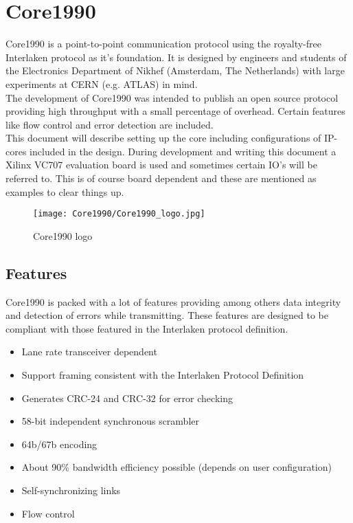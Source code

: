 \section{Core1990}
\label{Appendix:Core1990}
Core1990 is a point-to-point communication protocol using the royalty-free Interlaken protocol as it's foundation. It is designed by engineers and students of the Electronics Department of Nikhef (Amsterdam, The Netherlands) with large experiments at CERN (e.g. ATLAS) in mind. \\
The development of Core1990 was intended to publish an open source protocol providing high throughput with a small percentage of overhead. Certain features like flow control and error detection are included.\\

This document will describe setting up the core including configurations of IP-cores included in the design. During development and writing this document a Xilinx VC707 evaluation board is used and sometimes certain IO's will be referred to. This is of course board dependent and these are mentioned as examples to clear things up.

\begin{figure}[H]
	\centering
	\texttt{[image: Core1990/Core1990\_logo.jpg]}	
	\caption{Core1990 logo}
	\label{fig:Core1990_logo}
\end{figure} 

\subsection{Features}
	Core1990 is packed with a lot of features providing among others data integrity and detection of errors while transmitting. These features are designed to be compliant with those featured in the Interlaken protocol definition. 
	
	\begin{itemize}
		\item Lane rate transceiver dependent
		\item Support framing consistent with the Interlaken Protocol Definition
		\item Generates CRC-24 and CRC-32 for error checking
		\item 58-bit independent synchronous scrambler
		\item 64b/67b encoding
		\item About 90\% bandwidth efficiency possible (depends on user configuration)
		\item Self-synchronizing links
		\item Flow control
	\end{itemize}
	
